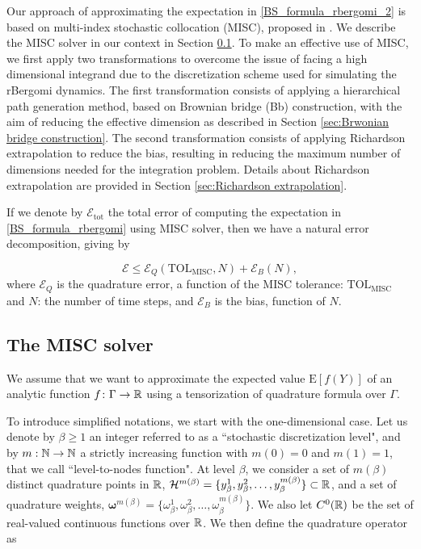 Our approach of approximating the expectation in \eqref{BS_formula_rbergomi_2} is based on multi-index stochastic collocation (MISC), proposed in \cite{haji2016multi}. We describe the  MISC solver in our context in Section \ref{sec:Details of the MISC}.  To make an effective use of MISC, we  first apply two transformations to overcome the issue of facing a high dimensional integrand due to the discretization scheme used for simulating the rBergomi dynamics. The first transformation consists of applying a hierarchical  path generation method, based on Brownian
bridge (Bb) construction, with the aim of reducing the effective dimension as  described  in Section \ref{sec:Brwonian bridge construction}. The second transformation consists of applying Richardson extrapolation to reduce the bias, resulting in reducing  the maximum number of dimensions needed for the integration problem. Details about  Richardson extrapolation  are provided in Section \ref{sec:Richardson extrapolation}.




If we denote by $\mathcal{E}_{\text{tot}}$ the total error of computing the  expectation in \eqref{BS_formula_rbergomi} using MISC solver, then we have a natural error decomposition, giving by
 
\begin{equation}\label{eq:total_error}
\mathcal{E} \le \mathcal{E}_Q(\text{TOL}_{\text{MISC}},N) + \mathcal{E}_B(N),
\end{equation}
where  $\mathcal{E}_Q$ is the quadrature error, a function of the MISC tolerance:  $\text{TOL}_{\text{MISC}}$ and $N$: the number of time steps,  and  $\mathcal{E}_B$  is the bias, function of $N$.

\subsection{The MISC solver}\label{sec:Details of the MISC}

We assume that we want to approximate the expected value $\text{E}[f(Y)]$ of an analytic function $f\colon \Gamma \to \mathbb{R}$ using a tensorization of quadrature formula over $\Gamma$.

To introduce simplified notations, we start with the one-dimensional case. Let us denote by $\beta \geq 1$ an integer referred to as a ``stochastic discretization level", and by $m: \mathbb{N} \rightarrow \mathbb{N}$  a strictly increasing function with $m(0)=0$ and $m(1)=1$, that we call  ``level-to-nodes function". At level $\beta$, we consider a set of $m(\beta)$ distinct quadrature points in $\mathbb{R}$, $\mathcal{H}^{m(\beta)}=\{y^1_\beta,y^2_\beta,\dots,y_\beta^{m(\beta)}\} \subset \mathbb{R}$, and a set of quadrature weights, $\boldsymbol{\omega}^{m(\beta)}=\{\omega^1_\beta,\omega^2_\beta,\dots,\omega_\beta^{m(\beta)}\}$. We also let $C^0(\mathbb{R})$ be the set of real-valued continuous functions over $\mathbb{R}$. We then define the quadrature operator as


